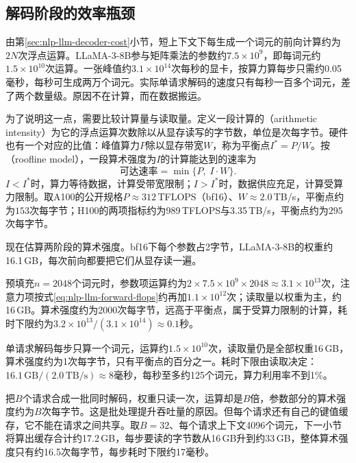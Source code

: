 \subsection{解码阶段的效率瓶颈}
\label{sec:nlp-inference-bottleneck}

由第\ref{sec:nlp-llm-decoder-cost}小节，短上下文下每生成一个词元的前向计算约为$2N$次浮点运算。LLaMA-3-8B参与矩阵乘法的参数约$7.5\times10^9$，即每词元约$1.5\times10^{10}$次运算。一张峰值约$3.1\times10^{14}$次每秒的显卡，按算力算每步只需约0.05毫秒，每秒可生成两万个词元。实际单请求解码的速度只有每秒一百多个词元，差了两个数量级。原因不在计算，而在数据搬运。

为了说明这一点，需要比较计算量与读取量。定义一段计算的（arithmetic intensity）为它的浮点运算次数除以从显存读写的字节数，单位是次每字节。硬件也有一个对应的比值：峰值算力$P$除以显存带宽$W$，称为平衡点$I^*=P/W$。按（roofline model），一段算术强度为$I$的计算能达到的速率为
\begin{equation}
 \text{可达速率}=\min\{P,\;I\cdot W\}.
 \label{eq:nlp-inference-roofline}
\end{equation}
$I<I^*$时，算力等待数据，计算受带宽限制；$I>I^*$时，数据供应充足，计算受算力限制。取A100的公开规格$P\approx312$\,TFLOPS（bf16）、$W\approx2.0$\,TB/s，平衡点约为$153$次每字节；H100的两项指标约为989\,TFLOPS与3.35\,TB/s，平衡点约为$295$次每字节。

现在估算两阶段的算术强度。bf16下每个参数占2字节，LLaMA-3-8B的权重约16.1\,GB，每次前向都要把它们从显存读一遍。

预填充$n=2048$个词元时，参数项运算约为$2\times7.5\times10^9\times2048\approx3.1\times10^{13}$次，注意力项按式\eqref{eq:nlp-llm-forward-flops}约再加$1.1\times10^{12}$次；读取量以权重为主，约16\,GB。算术强度约为2000次每字节，远高于平衡点，属于受算力限制的计算，耗时下限约为$3.2\times10^{13}/(3.1\times10^{14})\approx0.1$秒。

单请求解码每步只算一个词元，运算约$1.5\times10^{10}$次，读取量仍是全部权重16\,GB，算术强度约为1次每字节，只有平衡点的百分之一。耗时下限由读取决定：$16.1\,\mathrm{GB}/(2.0\,\mathrm{TB/s})\approx8$毫秒，每秒至多约125个词元，算力利用率不到1\%。

把$B$个请求合成一批同时解码，权重只读一次，运算却是$B$倍，参数部分的算术强度约为$B$次每字节。这是批处理提升吞吐量的原因。但每个请求还有自己的键值缓存，它不能在请求之间共享。取$B=32$、每个请求上下文4096个词元，下一小节将算出缓存合计约17.2\,GB，每步要读的字节数从16\,GB升到约33\,GB，整体算术强度只有约16.5次每字节，每步耗时下限约17毫秒。

